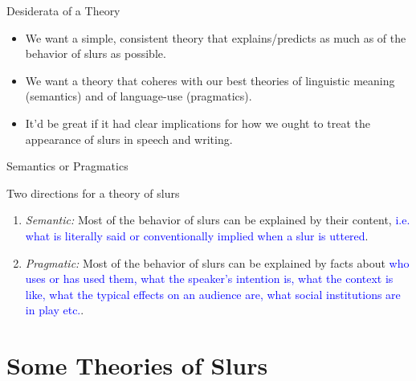 \documentclass[xcolor=dvipsnames,12pt,handout]{beamer}
\begin{document}
\begin{frame}{Desiderata of a Theory}
\begin{itemize}
\vspace{-1cm}
\item We want a simple, consistent theory that explains/predicts as much as of the behavior of slurs as possible.
\bigskip
\pause
\item We want a theory that coheres with our best theories of linguistic meaning (semantics) and of language-use (pragmatics).
\bigskip
\pause
\item It'd be great if it had clear implications for how we ought to treat the appearance of slurs in speech and writing.

\end{itemize}
\end{frame}

\begin{frame}{Semantics or Pragmatics}
\begin{block}{Two directions for a theory of slurs}
\begin{enumerate}
\pause
\item \textit{Semantic:} Most of the behavior of slurs can be explained by their content, \textcolor{blue}{i.e. what is literally said or conventionally implied when a slur is uttered}.
\bigskip
\pause
\item \textit{Pragmatic:} Most of the behavior of slurs can be explained by facts about \textcolor{blue}{who uses or has used them, what the speaker's intention is, what the context is like, what the typical effects on an audience are, what social institutions are in play etc.}.
\end{enumerate}
\end{block}
\end{frame}

\section{Some Theories of Slurs}
\end{document}
